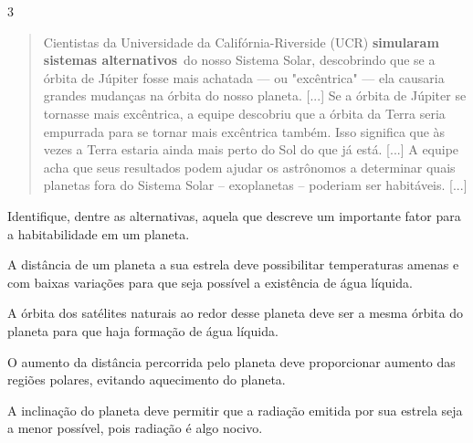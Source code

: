 \num{3}

\begin{quote}
Cientistas da Universidade da Califórnia-Riverside
(UCR) \textbf{simularam sistemas alternativos}~do nosso Sistema Solar,
descobrindo que se a órbita de Júpiter fosse mais achatada --- ou
"excêntrica" --- ela causaria grandes mudanças na órbita do nosso planeta. [...]
Se a órbita de Júpiter se tornasse mais excêntrica, a equipe
descobriu que a órbita da Terra seria empurrada para se tornar mais
excêntrica também. Isso significa que às vezes a Terra estaria ainda
mais perto do Sol do que já está. [...]
A equipe acha que seus resultados
podem ajudar os astrônomos a determinar quais planetas fora do Sistema
Solar -- exoplanetas -- poderiam ser habitáveis. [...]

\end{quote}

Identifique, dentre as alternativas, aquela que descreve um importante
fator para a habitabilidade em um planeta.

\begin{escolha}
\item
  A distância de um planeta a sua estrela deve possibilitar temperaturas
  amenas e com baixas variações para que seja possível a existência de
  água líquida.
\item
  A órbita dos satélites naturais ao redor desse planeta deve ser a
  mesma órbita do planeta para que haja formação de água líquida.
\item
  O aumento da distância percorrida pelo planeta deve proporcionar
  aumento das regiões polares, evitando aquecimento do planeta.
\item
  A inclinação do planeta deve permitir que a radiação emitida por sua
  estrela seja a menor possível, pois radiação é algo nocivo.
\end{escolha}


